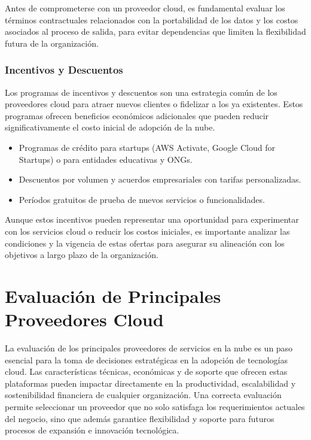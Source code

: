 {                Antes de comprometerse con un proveedor cloud, es fundamental evaluar los términos contractuales relacionados con la portabilidad de los datos y los costos asociados al proceso de salida, para evitar dependencias que limiten la flexibilidad futura de la organización.
                
            \subsubsection{Incentivos y Descuentos}
                Los programas de incentivos y descuentos son una estrategia común de los proveedores cloud para atraer nuevos clientes o fidelizar a los ya existentes. Estos programas ofrecen beneficios económicos adicionales que pueden reducir significativamente el costo inicial de adopción de la nube.
                
                \begin{itemize}
                    \item Programas de crédito para startups (AWS Activate, Google Cloud for Startups) o para entidades educativas y ONGs.
                    \item Descuentos por volumen y acuerdos empresariales con tarifas personalizadas.
                    \item Períodos gratuitos de prueba de nuevos servicios o funcionalidades.
                \end{itemize}

                Aunque estos incentivos pueden representar una oportunidad para experimentar con los servicios cloud o reducir los costos iniciales, es importante analizar las condiciones y la vigencia de estas ofertas para asegurar su alineación con los objetivos a largo plazo de la organización.

    \section{Evaluación de Principales Proveedores Cloud}
        La evaluación de los principales proveedores de servicios en la nube es un paso esencial para la toma de decisiones estratégicas en la adopción de tecnologías cloud. Las características técnicas, económicas y de soporte que ofrecen estas plataformas pueden impactar directamente en la productividad, escalabilidad y sostenibilidad financiera de cualquier organización. Una correcta evaluación permite seleccionar un proveedor que no solo satisfaga los requerimientos actuales del negocio, sino que además garantice flexibilidad y soporte para futuros procesos de expansión e innovación tecnológica.
            
}
